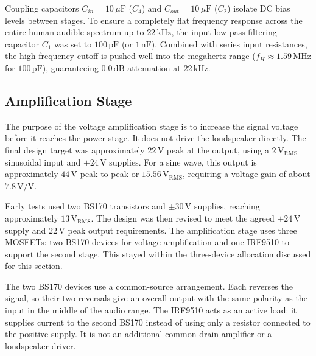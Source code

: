 \documentclass[conference]{IEEEtran}
\begin{document}
Coupling capacitors $C_{in} = 10\,\mu\mathrm{F}$ ($C_4$) and $C_{out} = 10\,\mu\mathrm{F}$ ($C_2$) isolate DC bias levels between stages. To ensure a completely flat frequency response across the entire human audible spectrum up to $22\,\mathrm{kHz}$, the input low-pass filtering capacitor $C_1$ was set to $100\,\mathrm{pF}$ (or $1\,\mathrm{nF}$). Combined with series input resistances, the high-frequency cutoff is pushed well into the megahertz range ($f_H \approx 1.59\,\mathrm{MHz}$ for $100\,\mathrm{pF}$), guaranteeing $0.0\,\mathrm{dB}$ attenuation at $22\,\mathrm{kHz}$.

\subsection{Amplification Stage}
The purpose of the voltage amplification stage is to increase the signal voltage before it reaches the power stage. It does not drive the loudspeaker directly. The final design target was approximately $22\,\mathrm{V}$ peak at the output, using a $2\,\mathrm{V_{RMS}}$ sinusoidal input and $\pm24\,\mathrm{V}$ supplies. For a sine wave, this output is approximately $44\,\mathrm{V}$ peak-to-peak or $15.56\,\mathrm{V_{RMS}}$, requiring a voltage gain of about $7.8\,\mathrm{V/V}$.


Early tests used two BS170 transistors and $\pm30\,\mathrm{V}$ supplies, reaching approximately $13\,\mathrm{V_{RMS}}$. The design was then revised to meet the agreed $\pm24\,\mathrm{V}$ supply and $22\,\mathrm{V}$ peak output requirements. The amplification stage uses three MOSFETs: two BS170 devices for voltage amplification and one IRF9510 to support the second stage. This stayed within the three-device allocation discussed for this section.

The two BS170 devices use a common-source arrangement. Each reverses the signal, so their two reversals give an overall output with the same polarity as the input in the middle of the audio range. The IRF9510 acts as an active load: it supplies current to the second BS170 instead of using only a resistor connected to the positive supply. It is not an additional common-drain amplifier or a loudspeaker driver.
\end{document}

